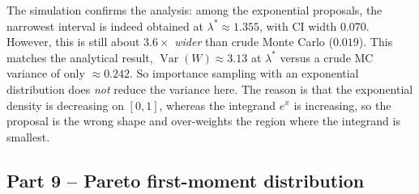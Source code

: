 The simulation confirms the analysis: among the exponential proposals, the narrowest interval is indeed obtained at $\lambda^* \approx 1.355$, with CI width $0.070$. However, this is still about $3.6\times$ \emph{wider} than crude Monte Carlo ($0.019$). This matches the analytical result, $\operatorname{Var}(W) \approx 3.13$ at $\lambda^*$ versus a crude MC variance of only $\approx 0.242$. So importance sampling with an exponential distribution does \emph{not} reduce the variance here. The reason is that the exponential density is decreasing on $[0,1]$, whereas the integrand $e^x$ is increasing, so the proposal is the wrong shape and over-weights the region where the integrand is smallest.

\subsection*{Part 9 -- Pareto first-moment distribution}